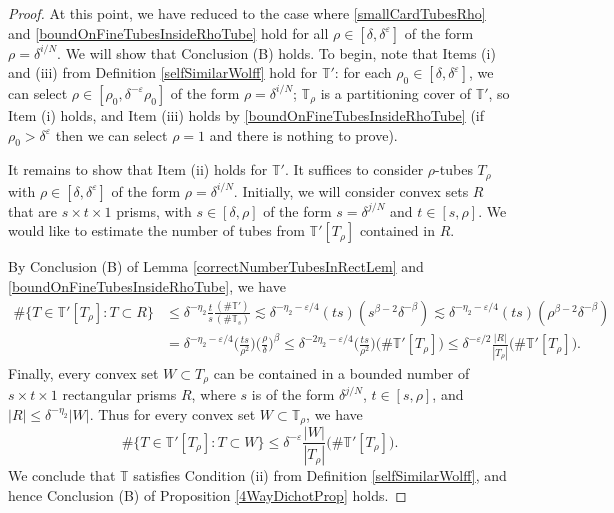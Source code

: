 \documentclass[letterpaper, reqno,11pt]{article}
\numberwithin{equation}{section}
\newcommand{\eps}{\varepsilon}
\newcommand{\tubes}{\mathbb{T}}
\numberwithin{thm}{section}
\theoremstyle{remark}
\begin{document}
\begin{proof}
\medskip

 At this point, we have reduced to the case where \eqref{smallCardTubesRho} and \eqref{boundOnFineTubesInsideRhoTube} hold for all $\rho\in[\delta,\delta^\eps]$ of the form $\rho=\delta^{i/N}$. We will show that Conclusion (B) holds. To begin, note that Items (i) and (iii) from Definition \ref{selfSimilarWolff} hold for $\tubes'$: for each $\rho_0\in[\delta,\delta^{\eps}]$, we can select $\rho\in [\rho_0, \delta^{-\eps}\rho_0]$ of the form $\rho=\delta^{i/N}$; $\tubes_\rho$ is a partitioning cover of $\tubes'$, so Item (i) holds, and Item (iii) holds by  \eqref{boundOnFineTubesInsideRhoTube} (if $\rho_0>\delta^{\eps}$ then we can select $\rho=1$ and there is nothing to prove). 

It remains to show that Item (ii) holds for $\tubes'$. It suffices to consider $\rho$-tubes $T_\rho$ with $\rho\in[\delta,\delta^{\eps}]$ of the form $\rho=\delta^{i/N}$. Initially, we will consider convex sets $R$ that are $s\times t\times 1$ prisms, with $s\in[\delta,\rho]$ of the form $s=\delta^{j/N}$ and $t\in[s,\rho]$.  We would like to estimate the number of tubes from $\tubes'[T_\rho]$ contained in $R$. 

By Conclusion (B) of Lemma \ref{correctNumberTubesInRectLem} and \eqref{boundOnFineTubesInsideRhoTube}, we have
 \begin{align*}
\#\{T\in\tubes'[T_\rho]\colon T\subset R\} 
&\leq  \delta^{-\eta_2}\frac{t}{s}\frac{(\#\tubes')}{(\#\tubes_s)} 
\lesssim \delta^{-\eta_2-\eps/4}(ts) (s^{\beta-2}\delta^{-\beta})
\lesssim \delta^{-\eta_2-\eps/4}(ts) (\rho^{\beta-2}\delta^{-\beta})\\
& = \delta^{-\eta_2-\eps/4}\Big(\frac{ts}{\rho^2}\Big)\Big(\frac{\rho}{\delta} \Big)^\beta
 \leq \delta^{-2\eta_2-\eps/4}\Big(\frac{ts}{\rho^2}\Big)\big(\#\tubes'[T_\rho]\big)
 \leq \delta^{-\eps/2}\frac{|R|}{|T_\rho|}\big(\#\tubes'[T_\rho]\big).
\end{align*}
Finally, every convex set $W\subset T_\rho$ can be contained in a bounded number of $s\times t\times 1$ rectangular prisms $R$, where $s$ is of the form $\delta^{j/N}$, $t\in[s,\rho]$, and $|R|\leq \delta^{-\eta_2}|W|$. Thus for every convex set $W\subset\tubes_\rho$, we have
\[
\#\{T\in\tubes'[T_\rho]\colon T\subset W\} \leq \delta^{-\eps}\frac{|W|}{|T_\rho|}\big(\#\tubes'[T_\rho]\big).
\]
We conclude that $\tubes$ satisfies Condition (ii) from Definition \ref{selfSimilarWolff}, and hence Conclusion (B) of Proposition \ref{4WayDichotProp} holds. 
\end{proof}
\end{document}
